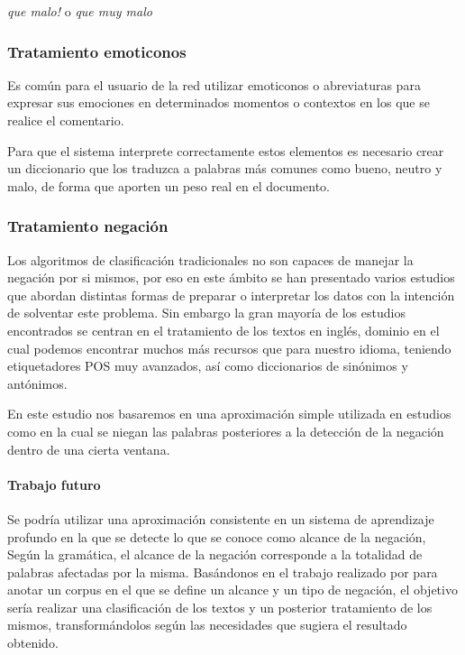 \textit{ que malo! } o \textit{ que muy malo }

\subsubsection{Tratamiento emoticonos}

Es común para el usuario de la red utilizar emoticonos o abreviaturas para expresar sus emociones en determinados momentos o contextos en los que se realice el comentario.

Para que el sistema interprete correctamente estos elementos es necesario crear un diccionario que los traduzca a palabras más comunes como bueno, neutro y malo, de forma que aporten un peso real en el documento.

\subsubsection{Tratamiento negación}\label{negtrat}

Los algoritmos de clasificación tradicionales no son capaces de manejar la negación por si mismos, por eso en este ámbito se han presentado varios estudios que abordan distintas formas de preparar o interpretar los datos con la intención de solventar este problema. Sin embargo la gran mayoría de los estudios encontrados se centran en el tratamiento de los textos en inglés, dominio en el cual podemos encontrar muchos más recursos que para nuestro idioma, teniendo etiquetadores POS muy avanzados, así como diccionarios de sinónimos y antónimos.

En este estudio nos basaremos en una aproximación simple utilizada en estudios como \cite{Coupling} \cite{Custreviews} en la cual se niegan las palabras posteriores a la detección de la negación dentro de una cierta ventana.

\paragraph{Trabajo futuro} Se podría utilizar una aproximación consistente en un sistema de aprendizaje profundo en la que se detecte lo que se conoce como alcance de la negación, Según la gramática, el alcance de la negación corresponde a la totalidad de palabras afectadas por la misma. Basándonos en el trabajo realizado por \cite{Negacion} para anotar un corpus en el que se define un alcance y un tipo de negación, el objetivo sería realizar una clasificación de los textos y un posterior tratamiento de los mismos, transformándolos según las necesidades que sugiera el resultado obtenido.

